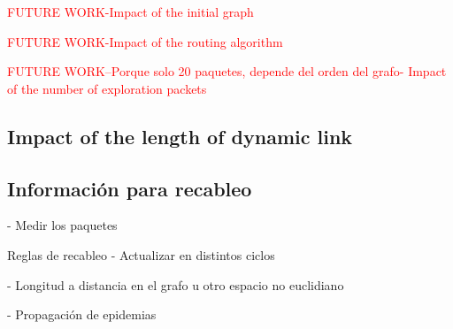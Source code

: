 \textcolor{red}{FUTURE WORK-Impact of the initial graph}

\textcolor{red}{FUTURE WORK-Impact of the routing algorithm}

\textcolor{red}{FUTURE WORK--Porque solo 20 paquetes, depende del orden del grafo- Impact of the number of exploration packets}

\subsection{Impact of the length of dynamic link}

\subsection{Información para recableo}
- Medir los paquetes 

Reglas de recableo
- Actualizar en distintos ciclos

- Longitud a distancia en el grafo u otro espacio no euclidiano

- Propagación de epidemias